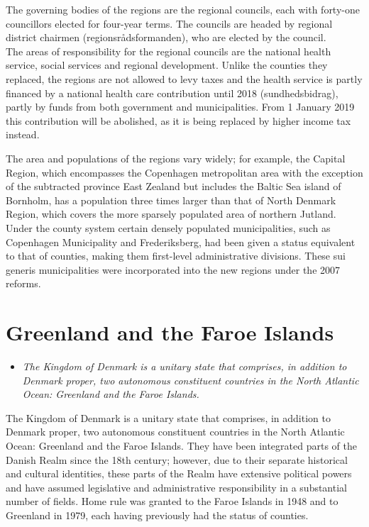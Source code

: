 The governing bodies of the regions are the regional councils, each with
forty-one councillors elected for four-year terms. The councils are
headed by regional district chairmen (regionsrådsformanden), who are
elected by the council.\\
The areas of responsibility for the regional councils are the national
health service, social services and regional development. Unlike the
counties they replaced, the regions are not allowed to levy taxes and
the health service is partly financed by a national health care
contribution until 2018 (sundhedsbidrag), partly by funds from both
government and municipalities. From 1 January 2019 this contribution
will be abolished, as it is being replaced by higher income tax instead.

The area and populations of the regions vary widely; for example, the
Capital Region, which encompasses the Copenhagen metropolitan area with
the exception of the subtracted province East Zealand but includes the
Baltic Sea island of Bornholm, has a population three times larger than
that of North Denmark Region, which covers the more sparsely populated
area of northern Jutland. Under the county system certain densely
populated municipalities, such as Copenhagen Municipality and
Frederiksberg, had been given a status equivalent to that of counties,
making them first-level administrative divisions. These sui generis
municipalities were incorporated into the new regions under the 2007
reforms.

\section{Greenland and the Faroe
Islands}\label{greenland-and-the-faroe-islands}

\begin{itemize}
\item
  \emph{The Kingdom of Denmark is a unitary state that comprises, in
  addition to Denmark proper, two autonomous constituent countries in
  the North Atlantic Ocean: Greenland and the Faroe Islands.}
\end{itemize}

The Kingdom of Denmark is a unitary state that comprises, in addition to
Denmark proper, two autonomous constituent countries in the North
Atlantic Ocean: Greenland and the Faroe Islands. They have been
integrated parts of the Danish Realm since the 18th century; however,
due to their separate historical and cultural identities, these parts of
the Realm have extensive political powers and have assumed legislative
and administrative responsibility in a substantial number of fields.
Home rule was granted to the Faroe Islands in 1948 and to Greenland in
1979, each having previously had the status of counties.

